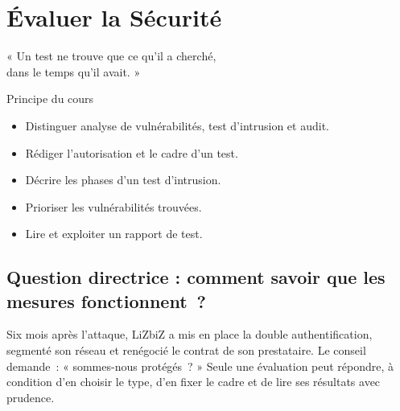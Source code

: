 
\chapter{Évaluer la Sécurité}
\label{chap:evaluer}

\epigraph{%
    « Un test ne trouve que ce qu'il a cherché,\\
    dans le temps qu'il avait. »%
}{Principe du cours}


\begin{boxobjectifs}
\begin{itemize}
    \item Distinguer analyse de vulnérabilités, test d'intrusion et audit.
    \item Rédiger l'autorisation et le cadre d'un test.
    \item Décrire les phases d'un test d'intrusion.
    \item Prioriser les vulnérabilités trouvées.
    \item Lire et exploiter un rapport de test.
\end{itemize}
\end{boxobjectifs}

\bigskip

\section*{Question directrice : comment savoir que les mesures fonctionnent~?}

Six mois après l'attaque, LiZbiZ a mis en place la double
authentification, segmenté son réseau et renégocié le contrat de son
prestataire. Le conseil demande~: « sommes-nous protégés~? » Seule une
évaluation peut répondre, à condition d'en choisir le type, d'en fixer le
cadre et de lire ses résultats avec prudence.

